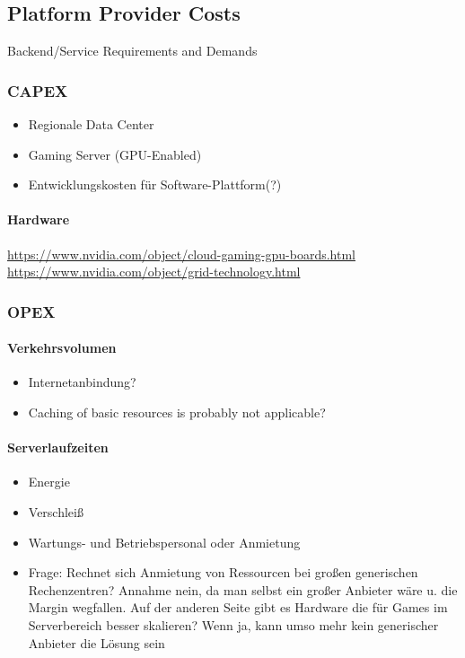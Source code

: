 \subsection{Platform Provider Costs}
Backend/Service Requirements and Demands

\subsubsection{CAPEX}

\begin{itemize}
	\item Regionale Data Center
	\item Gaming Server (GPU-Enabled)
	\item Entwicklungskosten für Software-Plattform(?)
\end{itemize}

\paragraph{Hardware}

\url{https://www.nvidia.com/object/cloud-gaming-gpu-boards.html}
\url{https://www.nvidia.com/object/grid-technology.html}


\subsubsection{OPEX}

\paragraph{Verkehrsvolumen}

\begin{itemize}
	\item Internetanbindung?
	\item Caching of basic resources is probably not applicable?
\end{itemize}

\paragraph{Serverlaufzeiten}

\begin{itemize}
	\item Energie
	\item Verschleiß
	\item Wartungs- und Betriebspersonal oder Anmietung
	\item Frage: Rechnet sich Anmietung von Ressourcen bei großen generischen Rechenzentren? Annahme nein, da man selbst ein großer Anbieter wäre u. die Margin wegfallen. Auf der anderen Seite gibt es Hardware die für Games im Serverbereich besser skalieren? Wenn ja, kann umso mehr kein generischer Anbieter die Lösung sein
\end{itemize}

